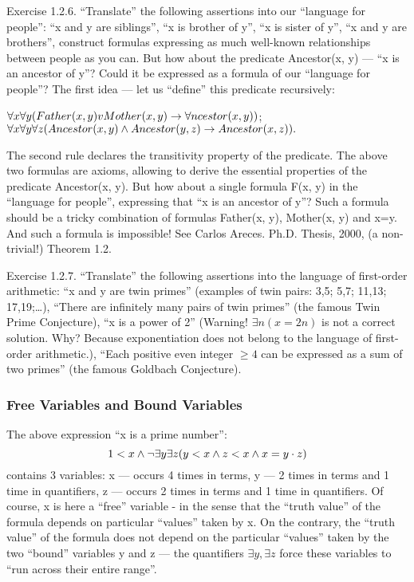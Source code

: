 Exercise 1.2.6. ``Translate'' the following assertions into our ``language for people'':
``x and y are siblings'',
``x is brother of y'', ``x is sister of y'',
``x and y are brothers'',
construct formulas expressing as much well-known relationships between people as you can.
But how about the predicate Ancestor(x, y) --- ``x is an ancestor of y''? Could it be expressed as a formula
of our ``language for people''? The first idea --- let us ``define'' this predicate recursively:

\(\forall x\forall y(Father(x, y) v Mother(x, y)\rightarrow \forall ncestor(x, y))\);
\(\forall x\forall y\forall z(Ancestor(x, y) \wedge  Ancestor(y, z)\rightarrow Ancestor(x, z)).\)

The second rule declares the transitivity property of the predicate. The above two formulas are axioms, allowing to derive the essential properties of the predicate Ancestor(x, y). But how about a single formula F(x, y) in the ``language for people'', expressing that ``x is an ancestor of y''? Such a formula should be a tricky combination of formulas Father(x, y), Mother(x, y) and x=y. And such a formula is impossible! See Carlos Areces. Ph.D. Thesis, 2000, (a non-trivial!) Theorem 1.2.

Exercise 1.2.7. ``Translate'' the following assertions into the language of first-order arithmetic:
``x and y are twin primes'' (examples of twin pairs: 3,5; 5,7; 11,13; 17,19;\ldots ),
``There are infinitely many pairs of twin primes'' (the famous Twin Prime Conjecture),
``x is a power of 2'' (Warning! \(\exists n(x=2n)\) is not a correct solution. Why? Because exponentiation does not
belong to the language of first-order arithmetic.),
``Each positive even integer \(\geq4\) can be expressed as a sum of two primes''
(the famous Goldbach Conjecture).

\subsubsection{Free Variables and Bound Variables}

The above expression ``x is a prime number'':
\[
1<x \wedge  \neg \exists y\exists z(y<x \wedge  z<x \wedge  x=y\cdot z)
\]
contains 3 variables: x --- occurs 4 times in terms, y --- 2 times in terms and 1 time in quantifiers, z --- occurs 2 times in terms and 1 time in quantifiers. Of course, x is here a ``free'' variable - in the sense that the ``truth value'' of the formula depends on particular ``values'' taken by x. On the contrary, the ``truth value'' of the formula does not depend on the particular ``values'' taken by the two ``bound'' variables y and z --- the quantifiers \(\exists y, \exists z\) force these variables to ``run across their entire range''.

